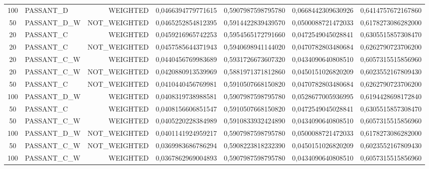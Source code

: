\begin{table}[H]
{\begin{tabular}{ c l r c c c c }
				100 &  PASSANT\_D &   WEIGHTED & 0,0466394779771615 & 0,5907987598795780 & 0,0668442309630926 & 0,6414757672167860 \\
				
				50 & PASSANT\_D\_W & NOT\_WEIGHTED & 0,0465252854812395 & 0,5914422839439570 & 0,0500088721472033 & 0,6178273086282000 \\
				
				20 &  PASSANT\_C &   WEIGHTED & 0,0459216965742253 & 0,5954565172791660 & 0,0472549045028841 & 0,6305515857308470 \\
				
				20 &  PASSANT\_C & NOT\_WEIGHTED & 0,0457585644371943 & 0,5940698941144020 & 0,0470782803480684 & 0,6262790723706200 \\
				
				20 & PASSANT\_C\_W &   WEIGHTED & 0,0440456769983689 & 0,5931726673607320 & 0,0434090640808510 & 0,6057315515856960 \\
				
				20 & PASSANT\_C\_W & NOT\_WEIGHTED & 0,0420880913539969 & 0,5881971371812860 & 0,0450151026820209 & 0,6023552167809430 \\
				
				50 &  PASSANT\_C & NOT\_WEIGHTED & 0,0410440456769981 & 0,5910507668150820 & 0,0470782803480684 & 0,6262790723706200 \\
				
				100 & PASSANT\_D\_W &   WEIGHTED & 0,0408319738988581 & 0,5907987598795780 & 0,0528677005936995 & 0,6194428698172840 \\
				
				50 &  PASSANT\_C &   WEIGHTED & 0,0408156606851547 & 0,5910507668150820 & 0,0472549045028841 & 0,6305515857308470 \\
				
				50 & PASSANT\_C\_W &   WEIGHTED & 0,0405220228384989 & 0,5910833932424890 & 0,0434090640808510 & 0,6057315515856960 \\
				
				100 & PASSANT\_D\_W & NOT\_WEIGHTED & 0,0401141924959217 & 0,5907987598795780 & 0,0500088721472033 & 0,6178273086282000 \\
				
				50 & PASSANT\_C\_W & NOT\_WEIGHTED & 0,0369983686786294 & 0,5908223818232390 & 0,0450151026820209 & 0,6023552167809430 \\
				
				100 & PASSANT\_C\_W &   WEIGHTED & 0,0367862969004893 & 0,5907987598795780 & 0,0434090640808510 & 0,6057315515856960 \\
				

\end{tabular}}
\end{table}

